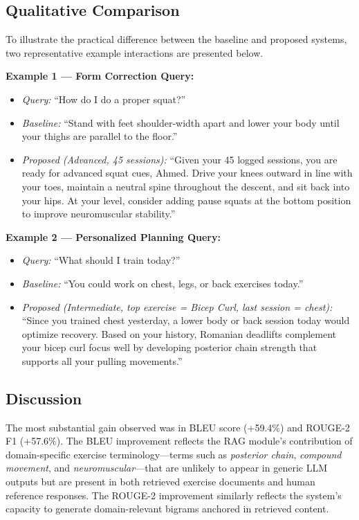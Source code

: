 \documentclass[conference]{IEEEtran}
\begin{document}
\subsection{Qualitative Comparison}

To illustrate the practical difference between the baseline and proposed systems, two representative example interactions are presented below.

\textbf{Example 1 — Form Correction Query:}
\begin{itemize}
    \item \textit{Query:} ``How do I do a proper squat?''
    \item \textit{Baseline:} ``Stand with feet shoulder-width apart and lower your body until your thighs are parallel to the floor.''
    \item \textit{Proposed (Advanced, 45 sessions):} ``Given your 45 logged sessions, you are ready for advanced squat cues, Ahmed. Drive your knees outward in line with your toes, maintain a neutral spine throughout the descent, and sit back into your hips. At your level, consider adding pause squats at the bottom position to improve neuromuscular stability.''
\end{itemize}

\textbf{Example 2 — Personalized Planning Query:}
\begin{itemize}
    \item \textit{Query:} ``What should I train today?''
    \item \textit{Baseline:} ``You could work on chest, legs, or back exercises today.''
    \item \textit{Proposed (Intermediate, top exercise = Bicep Curl, last session = chest):} ``Since you trained chest yesterday, a lower body or back session today would optimize recovery. Based on your history, Romanian deadlifts complement your bicep curl focus well by developing posterior chain strength that supports all your pulling movements.''
\end{itemize}

\subsection{Discussion}

The most substantial gain observed was in BLEU score (+59.4\%) and ROUGE-2 F1 (+57.6\%). The BLEU improvement reflects the RAG module's contribution of domain-specific exercise terminology—terms such as \textit{posterior chain}, \textit{compound movement}, and \textit{neuromuscular}—that are unlikely to appear in generic LLM outputs but are present in both retrieved exercise documents and human reference responses. The ROUGE-2 improvement similarly reflects the system's capacity to generate domain-relevant bigrams anchored in retrieved content.
\end{document}

